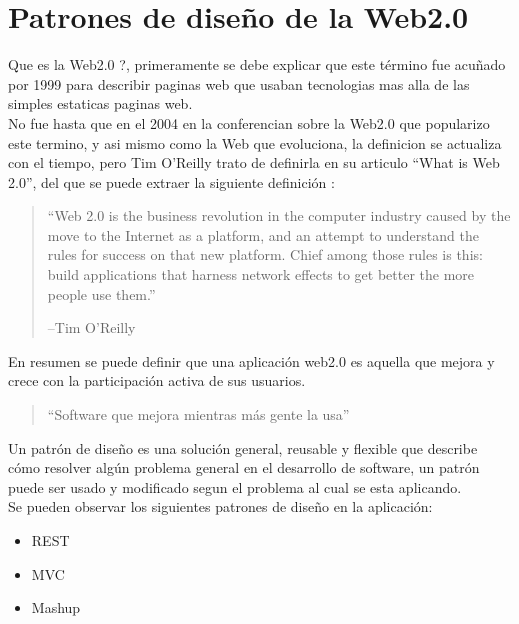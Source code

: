   \section{Patrones de diseño de la Web2.0} %
  \label{sec:patrones_web20}
    Que es la Web2.0 ?,  primeramente  se debe explicar que este término fue acuñado 
    por 1999 para describir paginas web que usaban tecnologias mas alla de las 
    simples estaticas paginas web.\\
    No fue hasta que en  el 2004 en la conferencian sobre la Web2.0 que popularizo este termino, 
    y asi mismo como la Web que evoluciona, la definicion se actualiza con el tiempo, 
    pero Tim O’Reilly trato de definirla en su articulo “What is Web 2.0”\cite{web5}, 
    del que se puede extraer la siguiente definici\'on :
    \begin{quote}
      “Web 2.0 is the business revolution in the computer industry caused by the move to the
       Internet as a platform, and an attempt to understand the rules for success on that new
       platform. Chief among those rules is this: build applications that harness network
       effects to get better the more people use them.”
       \begin{flushright}
       --Tim O’Reilly \cite{web9}
       \end{flushright}
    \end{quote}
    En resumen se puede definir que una aplicación web2.0 es aquella que mejora y crece con la 
    participación activa de sus usuarios.

    \begin{quote}
      “Software que mejora mientras más gente la usa” \cite{web5}
    \end{quote}

    Un patrón de diseño es una solución general, reusable  y flexible 
    que describe cómo resolver algún problema general en el desarrollo 
    de software, un patrón puede ser usado y modificado segun el problema 
    al cual se esta aplicando.\\
    Se pueden observar los siguientes patrones de dise\~no en la aplicación:
    \begin{itemize}
      \item REST
      \item MVC
      \item Mashup
    \end{itemize}
    


